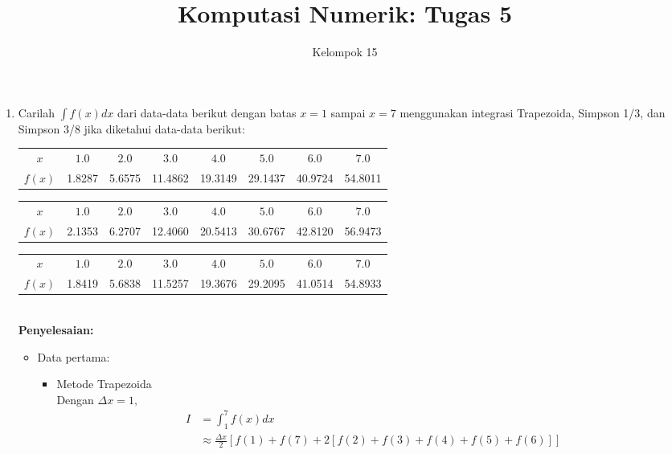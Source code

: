 \documentclass{article}
\title{\textbf{Komputasi Numerik: Tugas 5}}
\author{Kelompok 15}
\date{}
\newcommand{\penyelesaian}{\textbf{Penyelesaian: }}
\begin{document}
\maketitle

\begin{enumerate}
    \item Carilah $\int f(x) dx$ dari data-data berikut dengan batas $x=1$ sampai $x=7$ menggunakan integrasi Trapezoida, Simpson 1/3, dan Simpson 3/8 jika diketahui data-data berikut: \\
    \begin{tabular}{ c c c c c c c c }
        $x$ & $\num{1,0}$ & $\num{2,0}$ & $\num{3,0}$ & $\num{4,0}$ & $\num{5,0}$ & $\num{6,0}$ & $\num{7,0}$\\
        $f(x)$ & \num{1,8287} & \num{5,6575} & \num{11,4862} & \num{19,3149} & \num{29,1437} & \num{40,9724} & \num{54,8011} \\
    \end{tabular}
    \begin{tabular}{ c c c c c c c c }
        $x$ & $\num{1,0}$ & $\num{2,0}$ & $\num{3,0}$ & $\num{4,0}$ & $\num{5,0}$ & $\num{6,0}$ & $\num{7,0}$\\
        $f(x)$ & \num{2,1353} & \num{6,2707} & \num{12,4060} & \num{20,5413} & \num{30,6767} & \num{42,8120} & \num{56,9473} \\
    \end{tabular}
    \begin{tabular}{ c c c c c c c c }
        $x$ & $\num{1,0}$ & $\num{2,0}$ & $\num{3,0}$ & $\num{4,0}$ & $\num{5,0}$ & $\num{6,0}$ & $\num{7,0}$\\
        $f(x)$ & \num{1,8419} & \num{5,6838} & \num{11,5257} & \num{19,3676} & \num{29,2095} & \num{41,0514} & \num{54,8933} \\
    \end{tabular} \\
    \penyelesaian
    \begin{itemize}
        \item Data pertama: \\
        \begin{itemize}
            \item Metode Trapezoida \\
            Dengan $\Delta x = 1,$
            \begin{align*}
                I &= \int_{1}^{7} f(x) dx \\
                &\approx \frac{\Delta x}{2} \left [f(1) + f(7) + 2 \left [f(2) + f(3) + f(4) + f(5) + f(6)\right ] \right ] \\

\end{align*}
\end{itemize}
\end{itemize}
\end{enumerate}
\end{document}
